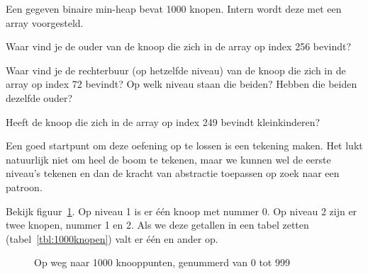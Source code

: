 \begin{oef}
\papier Een gegeven binaire min-heap bevat 1000 knopen. Intern wordt deze met een array voorgesteld.
\begin{oefenumerate}
	\item Waar vind je de ouder van de knoop die zich in de array op index 256 bevindt?
	\item Waar vind je de rechterbuur (op hetzelfde niveau) van de knoop die zich in de array op index 72 bevindt? Op welk niveau staan die beiden? Hebben die beiden dezelfde ouder?
	\item Heeft de knoop die zich in de array op index 249 bevindt kleinkinderen?
\end{oefenumerate}
\begin{opl}
Een goed startpunt om deze oefening op te lossen is een tekening maken. Het lukt natuurlijk niet om heel de boom te tekenen, maar we kunnen wel de eerste niveau's tekenen en dan de kracht van abstractie toepassen op zoek naar een patroon.

Bekijk figuur~\ref{fig:1000knopen}. Op niveau 1 is er één knoop met nummer 0. Op niveau 2 zijn er twee knopen, nummer 1 en 2. Als we deze getallen in een tabel zetten (tabel~\ref{tbl:1000knopen}) valt er één en ander op.
\begin{figure}[htbp]
    \centering
{}
\caption{Op weg naar 1000 knooppunten, genummerd van 0 tot 999}
    \label{fig:1000knopen}
\end{figure}


\end{opl}
\end{oef}
